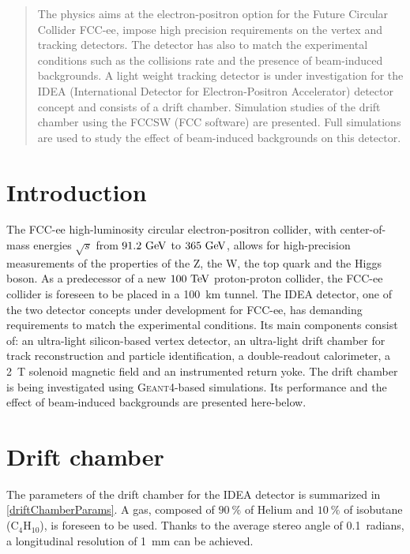 \documentclass[conference]{IEEEtran}
\begin{document}




\maketitle

\begin{abstract}
The physics aims at the electron-positron option for  the Future Circular Collider FCC-ee, impose high precision requirements on the vertex and tracking detectors.  The detector has also to match the experimental conditions such as the collisions rate and the presence of beam-induced backgrounds.
A light weight tracking detector is under investigation for the IDEA (International Detector for Electron-Positron Accelerator) detector concept and consists of a drift chamber. Simulation studies of the drift chamber using the FCCSW (FCC software) are presented. Full simulations are used to study the effect of beam-induced backgrounds on this detector.

\end{abstract}

\IEEEpeerreviewmaketitle



\section{Introduction}
The FCC-ee high-luminosity circular electron-positron collider, with center-of-mass energies $\sqrt{s}$ from $91.2\,\mathrm{\,Ge\kern -0.1em V}$ to
$365\,\mathrm{\,Ge\kern -0.1em V}$, allows for high-precision measurements of the properties of the Z, the W, the top quark and the Higgs boson. As a predecessor of a new $100\,\mathrm{\,Te\kern -0.1em V}$ proton-proton collider, the FCC-ee collider is foreseen to be placed in a 100~km tunnel. The IDEA detector, one of the two detector concepts under development for FCC-ee, has demanding requirements to match the experimental conditions. Its main components consist of: an ultra-light silicon-based vertex detector, an ultra-light drift chamber for track reconstruction and particle identification, a double-readout calorimeter, a 2~T solenoid magnetic field and an instrumented return yoke. The drift chamber is being investigated using \textsc{Geant4}-based simulations. Its performance and the effect of beam-induced backgrounds are presented here-below.


\section{Drift chamber}
The parameters of the drift chamber for the IDEA detector is summarized in \cref{driftChamberParams}. A gas, composed of $90~\%$ of Helium and $10~\%$ of isobutane ($\text{C}_{4}\text{H}_{10}$), is foreseen to be used. Thanks to the average stereo angle of 0.1~radians, a longitudinal resolution of 1~mm can be achieved.
\end{document}
